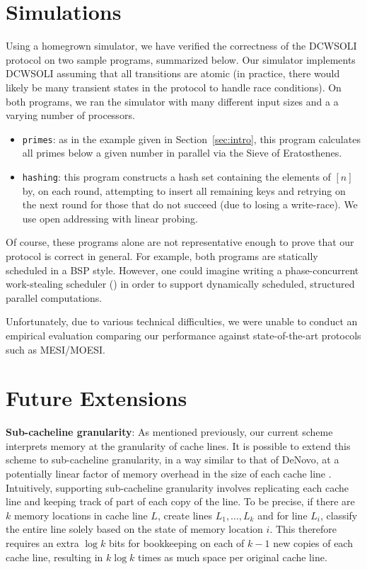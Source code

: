 \documentclass{article}
\begin{document}
\section{Simulations}

Using a homegrown simulator, we have verified the correctness of the DCWSOLI
protocol on two sample programs, summarized below. Our simulator implements
DCWSOLI assuming that all transitions are atomic (in practice, there would
likely be many transient states in the protocol to handle race conditions).
On both programs, we ran the simulator with many different input sizes and a
a varying number of processors.
\begin{itemize}
  \item \texttt{primes}: as in the example given in Section~\ref{sec:intro},
  this program calculates all primes below a given number in parallel via the
  Sieve of Eratosthenes.
  \item \texttt{hashing}: this program constructs a hash set containing the
  elements of $[n]$ by, on each round, attempting to insert all remaining
  keys and retrying on the next round for those that do not succeed (due to
  losing a write-race). We use open addressing with linear probing.
\end{itemize}
Of course, these programs alone are not representative enough to prove that
our protocol is correct in general. For example, both programs are statically
scheduled in a BSP style. However, one could imagine writing a phase-concurrent
work-stealing scheduler (\cite{blumofe1999scheduling}) in order to support
dynamically scheduled, structured parallel computations.

Unfortunately, due to various technical difficulties, we were unable to conduct
an empirical evaluation comparing our performance against state-of-the-art
protocols such as MESI/MOESI.


\section{Future Extensions}
\textbf{Sub-cacheline granularity}: As mentioned previously, our current scheme interprets memory at the granularity of cache lines. It is possible to extend this scheme to sub-cacheline granularity, in a way similar to that of DeNovo, at a potentially linear factor of memory overhead in the size of each cache line \cite{choi2010denovo}. Intuitively, supporting sub-cacheline granularity involves replicating each cache line and keeping track of part of each copy of the line. To be precise, if there are $k$ memory locations in cache line $L$, create lines $L_1, \dots, L_k$ and for line $L_i$, classify the entire line solely based on the state of memory location $i$. This therefore requires an extra $\log k$ bits for bookkeeping on each of $k-1$ new copies of each cache line, resulting in $k \log k$ times as much space per original cache line.
\end{document}

